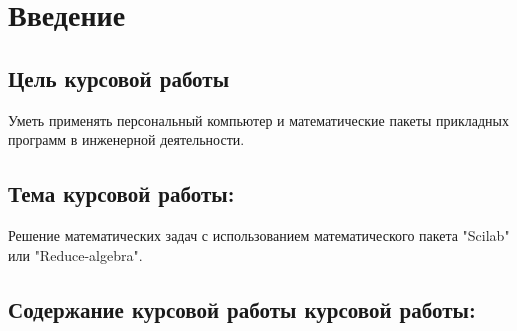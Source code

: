 \documentclass[russian,utf8,nocolumnxxxi,nocolumnxxxii]{eskdtext}
\begin{document}
\maketitle

\newpage

\tableofcontents%

\newpage %

\section{Введение} %

\subsection{Цель курсовой работы} %

Уметь применять персональный компьютер и математические пакеты прикладных программ в инженерной деятельности.

\subsection{Тема курсовой работы:}

Решение математических задач с использованием математического пакета "Scilab" или "Reduce-algebra".

\subsection{Содержание курсовой работы курсовой работы:}
\end{document}
